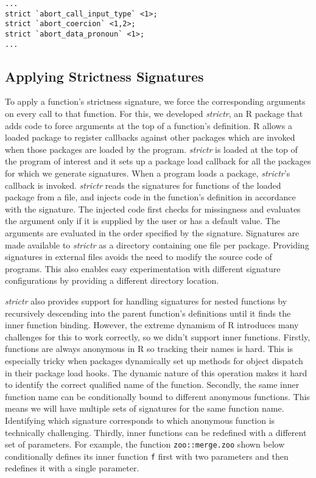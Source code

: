 \documentclass[screen,acmsmall]{acmart}
\newcommand{\code}[1]{\lstinline[style=R]|#1|\xspace}
\begin{document}
\begin{verbatim}
...
strict `abort_call_input_type` <1>;
strict `abort_coercion` <1,2>;
strict `abort_data_pronoun` <1>;
...
\end{verbatim}

\subsection{Applying Strictness Signatures}

To apply a function's strictness signature, we force the corresponding arguments
on every call to that function. For this, we developed \emph{strictr}, an R
package that adds code to force arguments at the top of a function's definition.
R allows a loaded package to register callbacks against other packages which are
invoked when those packages are loaded by the program. \emph{strictr} is loaded
at the top of the program of interest and it sets up a package load callback for
all the packages for which we generate signatures. When a program loads a
package, \emph{strictr}'s callback is invoked. \emph{strictr} reads the
signatures for functions of the loaded package from a file, and injects code in
the function's definition in accordance with the signature. The injected code
first checks for missingness and evaluates the argument only if it is supplied
by the user or has a default value. The arguments are evaluated in the order
specified by the signature. Signatures are made available to \emph{strictr} as a
directory containing one file per package. Providing signatures in external
files avoids the need to modify the source code of programs. This also enables
easy experimentation with different signature configurations by providing a
different directory location.

\emph{strictr} also provides support for handling signatures for nested
functions by recursively descending into the parent function's definitions until
it finds the inner function binding. However, the extreme dynamism of R
introduces many challenges for this to work correctly, so we didn't support
inner functions. Firstly, functions are always anonymous in R so tracking their
names is hard. This is especially tricky when packages dynamically set up
methods for object dispatch in their package load hooks. The dynamic nature of
this operation makes it hard to identify the correct qualified name of the
function. Secondly, the same inner function name can be conditionally bound to
different anonymous functions. This means we will have multiple sets of
signatures for the same function name. Identifying which signature corresponds
to which anonymous function is technically challenging. Thirdly, inner functions
can be redefined with a different set of parameters. For example, the function
\code{zoo::merge.zoo} shown below conditionally defines its inner function
\code{f} first with two parameters and then redefines it with a single
parameter.
\end{document}

